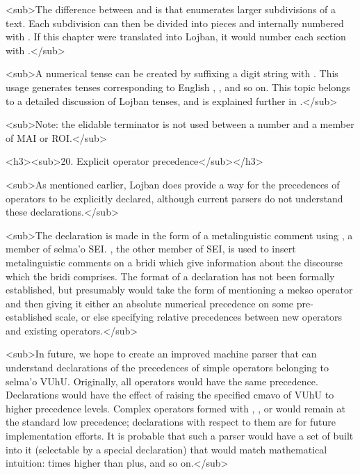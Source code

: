 <sub>The difference between  and  is that
     enumerates larger subdivisions of a text. Each
     subdivision can then be divided into pieces and
    internally numbered with . If this chapter were
    translated into Lojban, it would number each section with
    .</sub>

<sub>A numerical tense can be created by suffixing a digit
    string with . This usage generates tenses corresponding
    to English , , and so on. This topic belongs
    to a detailed discussion of Lojban tenses, and is explained
    further in .</sub>

<sub>Note: the elidable terminator  is not used
    between a number and a member of MAI or ROI.</sub>

<h3><sub>20. Explicit operator precedence</sub></h3>

<sub>As mentioned earlier, Lojban does provide a way for the
    precedences of operators to be explicitly declared, although
    current parsers do not understand these declarations.</sub>

<sub>The declaration is made in the form of a metalinguistic
    comment using , a member of selma'o SEI. , the
    other member of SEI, is used to insert metalinguistic comments
    on a bridi which give information about the discourse which the
    bridi comprises. The format of a  declaration has not
    been formally established, but presumably would take the form
    of mentioning a mekso operator and then giving it either an
    absolute numerical precedence on some pre-established scale, or
    else specifying relative precedences between new operators and
    existing operators.</sub>

<sub>In future, we hope to create an improved machine parser
    that can understand declarations of the precedences of simple
    operators belonging to selma'o VUhU. Originally, all operators
    would have the same precedence. Declarations would have the
    effect of raising the specified cmavo of VUhU to higher
    precedence levels. Complex operators formed with ,
    , or  would remain at the standard low
    precedence; declarations with respect to them are for future
    implementation efforts. It is probable that such a parser would
    have a set of  built into it
    (selectable by a special  declaration) that would match
    mathematical intuition: times higher than plus, and so
    on.</sub>


